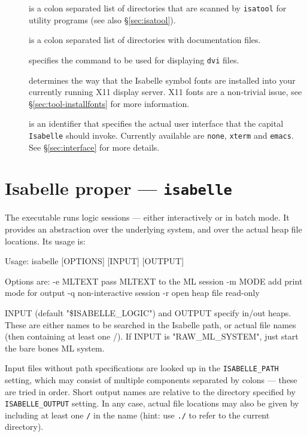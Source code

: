 \begin{description}
\item[] is a colon separated list of
  directories that are scanned by \texttt{isatool} for utility
  programs (see also \S\ref{sec:isatool}).

\item[] is a colon separated list of directories
  with documentation files.
  
\item[] specifies the command to be used for
  displaying \texttt{dvi} files.
  
\item[] determines the way that the
  Isabelle symbol fonts are installed into your currently running X11
  display server. X11 fonts are a non-trivial issue, see
  \S\ref{sec:tool-installfonts} for more information.
  
\item[] is an identifier that specifies the
  actual user interface that the capital \texttt{Isabelle} should
  invoke.  Currently available are \texttt{none}, \texttt{xterm} and
  \texttt{emacs}. See \S\ref{sec:interface} for more details.

\end{description}


\section{Isabelle proper --- \texttt{isabelle}}

The  executable runs logic sessions --- either
interactively or in batch mode. It provides an abstraction over the
underlying {\ML} system, and over the actual heap file locations. Its
usage is:
\begin{ttbox}
Usage: isabelle [OPTIONS] [INPUT] [OUTPUT]

  Options are:
    -e MLTEXT    pass MLTEXT to the ML session
    -m MODE      add print mode for output
    -q           non-interactive session
    -r           open heap file read-only

  INPUT (default "\$ISABELLE_LOGIC") and OUTPUT specify in/out heaps.
  These are either names to be searched in the Isabelle path, or actual
  file names (then containing at least one /).
  If INPUT is "RAW_ML_SYSTEM", just start the bare bones ML system.
\end{ttbox}
Input files without path specifications are looked up in the
\texttt{ISABELLE_PATH} setting, which may consist of multiple
components separated by colons --- these are tried in order.  Short
output names are relative to the directory specified by
\texttt{ISABELLE_OUTPUT} setting.  In any case, actual file locations
may also be given by including at least one \texttt{/} in the name
(hint: use \texttt{./} to refer to the current directory).


